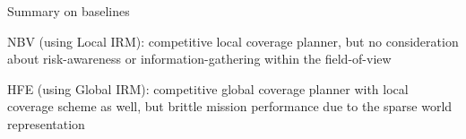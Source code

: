 \documentclass[letterpaper]{article} %
\begin{document}
Summary on baselines

NBV (using Local IRM): competitive local coverage planner, but no consideration about risk-awareness or information-gathering within the field-of-view

HFE (using Global IRM): competitive global coverage planner with local coverage scheme as well, but brittle mission performance due to the sparse world representation








\end{document}
